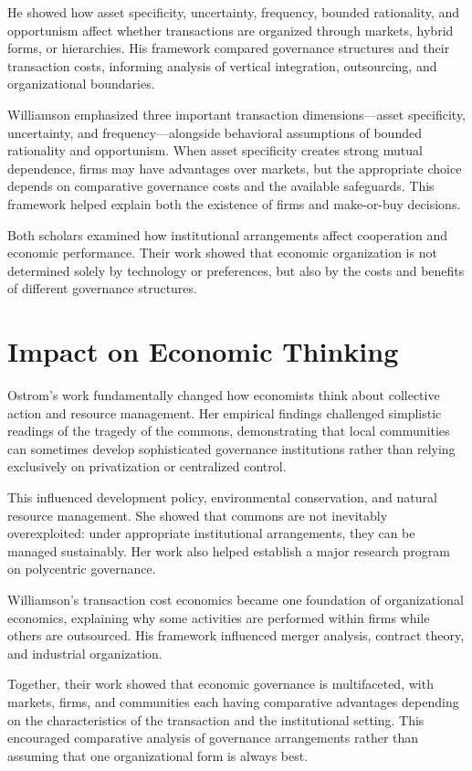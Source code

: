 He showed how asset specificity, uncertainty, frequency, bounded rationality, and
opportunism affect whether transactions are organized through markets, hybrid
forms, or hierarchies. His framework compared governance structures and their
transaction costs, informing analysis of vertical integration, outsourcing, and
organizational boundaries.

Williamson emphasized three important transaction dimensions---asset specificity,
uncertainty, and frequency---alongside behavioral assumptions of bounded
rationality and opportunism. When asset specificity creates strong mutual
dependence, firms may have advantages over markets, but the appropriate choice
depends on comparative governance costs and the available safeguards. This
framework helped explain both the existence of firms and make-or-buy decisions.

Both scholars examined how institutional arrangements affect cooperation and
economic performance. Their work showed that economic organization is not
determined solely by technology or preferences, but also by the costs and benefits
of different governance structures.

\section{Impact on Economic Thinking}
Ostrom's work fundamentally changed how economists think about collective action
and resource management. Her empirical findings challenged simplistic readings of
the tragedy of the commons, demonstrating that local communities can sometimes
develop sophisticated governance institutions rather than relying exclusively on
privatization or centralized control.

This influenced development policy, environmental conservation, and natural
resource management. She showed that commons are not inevitably overexploited:
under appropriate institutional arrangements, they can be managed sustainably.
Her work also helped establish a major research program on polycentric
governance.

Williamson's transaction cost economics became one foundation of organizational
economics, explaining why some activities are performed within firms while others
are outsourced. His framework influenced merger analysis, contract theory, and
industrial organization.

Together, their work showed that economic governance is multifaceted, with
markets, firms, and communities each having comparative advantages depending on
the characteristics of the transaction and the institutional setting. This
encouraged comparative analysis of governance arrangements rather than assuming
that one organizational form is always best.

